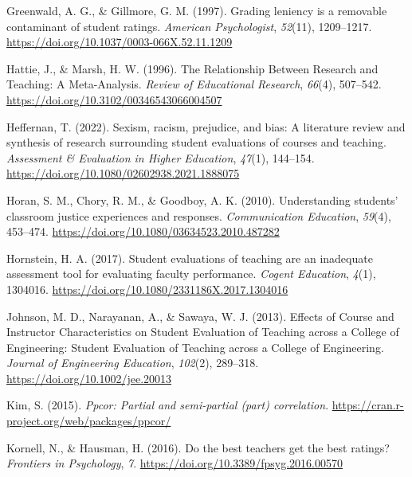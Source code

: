 \documentclass[
  man]{apa7}
\newlength{\cslhangindent}
\newlength{\cslentryspacingunit} %
\newenvironment{CSLReferences}[2] %
 {%
  \setlength{\parindent}{0pt}
  \ifodd #1
  \let\oldpar\par
  \def\par{\hangindent=\cslhangindent\oldpar}
  \fi
  \setlength{\parskip}{#2\cslentryspacingunit}
 }%
 {}
\begin{document}
\begin{CSLReferences}{1}{0}
\leavevmode{}%
Greenwald, A. G., \& Gillmore, G. M. (1997). Grading leniency is a removable contaminant of student ratings. \emph{American Psychologist}, \emph{52}(11), 1209--1217. \url{https://doi.org/10.1037/0003-066X.52.11.1209}

\leavevmode{}%
Hattie, J., \& Marsh, H. W. (1996). The Relationship Between Research and Teaching: A Meta-Analysis. \emph{Review of Educational Research}, \emph{66}(4), 507--542. \url{https://doi.org/10.3102/00346543066004507}

\leavevmode{}%
Heffernan, T. (2022). Sexism, racism, prejudice, and bias: A literature review and synthesis of research surrounding student evaluations of courses and teaching. \emph{Assessment \& Evaluation in Higher Education}, \emph{47}(1), 144--154. \url{https://doi.org/10.1080/02602938.2021.1888075}

\leavevmode{}%
Horan, S. M., Chory, R. M., \& Goodboy, A. K. (2010). Understanding students' classroom justice experiences and responses. \emph{Communication Education}, \emph{59}(4), 453--474. \url{https://doi.org/10.1080/03634523.2010.487282}

\leavevmode{}%
Hornstein, H. A. (2017). Student evaluations of teaching are an inadequate assessment tool for evaluating faculty performance. \emph{Cogent Education}, \emph{4}(1), 1304016. \url{https://doi.org/10.1080/2331186X.2017.1304016}

\leavevmode{}%
Johnson, M. D., Narayanan, A., \& Sawaya, W. J. (2013). Effects of Course and Instructor Characteristics on Student Evaluation of Teaching across a College of Engineering: Student Evaluation of Teaching across a College of Engineering. \emph{Journal of Engineering Education}, \emph{102}(2), 289--318. \url{https://doi.org/10.1002/jee.20013}

\leavevmode{}%
Kim, S. (2015). \emph{Ppcor: Partial and semi-partial (part) correlation}. \url{https://cran.r-project.org/web/packages/ppcor/}

\leavevmode{}%
Kornell, N., \& Hausman, H. (2016). Do the best teachers get the best ratings? \emph{Frontiers in Psychology}, \emph{7}. \url{https://doi.org/10.3389/fpsyg.2016.00570}


\end{CSLReferences}
\end{document}
